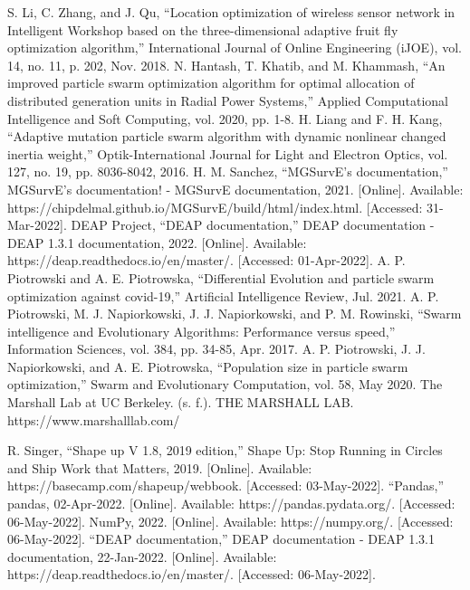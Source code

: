 \documentclass[letterpaper]{report}
\begin{document}
\begin{thebibliography}{99}
  S. Li, C. Zhang, and J. Qu, “Location optimization of wireless sensor network in Intelligent Workshop based on the three-dimensional adaptive fruit fly optimization algorithm,” International Journal of Online Engineering (iJOE), vol. 14, no. 11, p. 202, Nov. 2018. 
  N. Hantash, T. Khatib, and M. Khammash, “An improved particle swarm optimization algorithm for optimal allocation of distributed generation units in Radial Power Systems,” Applied Computational Intelligence and Soft Computing, vol. 2020, pp. 1-8.
  H. Liang and F. H. Kang, “Adaptive mutation particle swarm algorithm with dynamic nonlinear changed inertia weight,” Optik-International Journal for Light and Electron Optics, vol. 127, no. 19, pp. 8036-8042, 2016.
  H. M. Sanchez, “MGSurvE's documentation,” MGSurvE's documentation! - MGSurvE documentation, 2021. [Online]. Available: https://chipdelmal.github.io/MGSurvE/build/html/index.html. [Accessed: 31-Mar-2022]. 
  DEAP Project, “DEAP documentation,” DEAP documentation - DEAP 1.3.1 documentation, 2022. [Online]. Available: https://deap.readthedocs.io/en/master/. [Accessed: 01-Apr-2022]. 
  A. P. Piotrowski and A. E. Piotrowska, “Differential Evolution and particle swarm optimization against covid-19,” Artificial Intelligence Review, Jul. 2021. 
  A. P. Piotrowski, M. J. Napiorkowski, J. J. Napiorkowski, and P. M. Rowinski, “Swarm intelligence and Evolutionary Algorithms: Performance versus speed,” Information Sciences, vol. 384, pp. 34-85, Apr. 2017. 
  A. P. Piotrowski, J. J. Napiorkowski, and A. E. Piotrowska, “Population size in particle swarm optimization,” Swarm and Evolutionary Computation, vol. 58, May 2020. 
  The Marshall Lab at UC Berkeley. (s. f.). THE MARSHALL LAB. https://www.marshalllab.com/

  R. Singer, “Shape up V 1.8, 2019 edition,” Shape Up: Stop Running in Circles and Ship Work that Matters, 2019. [Online]. Available: https://basecamp.com/shapeup/webbook. [Accessed: 03-May-2022]. 
  “Pandas,” pandas, 02-Apr-2022. [Online]. Available: https://pandas.pydata.org/. [Accessed: 06-May-2022]. 
  NumPy, 2022. [Online]. Available: https://numpy.org/. [Accessed: 06-May-2022]. 
  “DEAP documentation,” DEAP documentation - DEAP 1.3.1 documentation, 22-Jan-2022. [Online]. Available: https://deap.readthedocs.io/en/master/. [Accessed: 06-May-2022]. 
\end{thebibliography}
\end{document}
